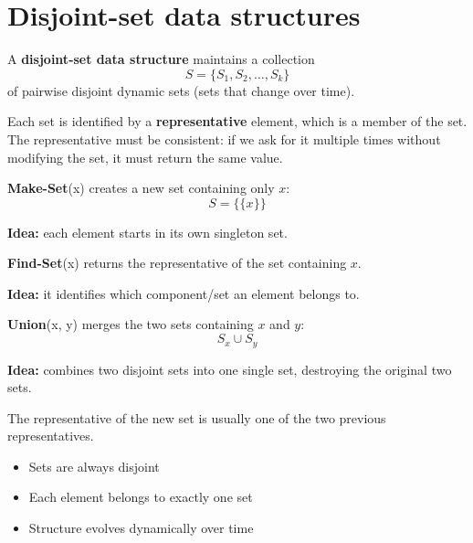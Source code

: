 \documentclass[11pt,a4paper,openany]{book}
\begin{document}
\vspace{2cm}





\chapter{Disjoint-set data structures}


\begin{defnbox}[title=Disjoint-Set Data Structure (Union-Find)]
A \textbf{disjoint-set data structure} maintains a collection
\[
S = \{S_1, S_2, \dots, S_k\}
\]
of pairwise disjoint dynamic sets (sets that change over time).

Each set is identified by a \textbf{representative} element, which is a member of the set.
The representative must be consistent: if we ask for it multiple times without modifying the set, it must return the same value.
\end{defnbox}

\begin{defnbox}[title=Make-Set]
\textbf{Make-Set}(x) creates a new set containing only $x$:
\[
S = \{\{x\}\}
\]

\textbf{Idea:} each element starts in its own singleton set.
\end{defnbox}

\begin{defnbox}[title=Find-Set]
\textbf{Find-Set}(x) returns the representative of the set containing $x$.

\textbf{Idea:} it identifies which component/set an element belongs to.
\end{defnbox}

\begin{defnbox}[title=Union]
\textbf{Union}(x, y) merges the two sets containing $x$ and $y$:
\[
S_x \cup S_y
\]

\textbf{Idea:} combines two disjoint sets into one single set, destroying the original two sets.

The representative of the new set is usually one of the two previous representatives.
\end{defnbox}

\begin{defnbox}[title=Key Properties]
\begin{itemize}
    \item Sets are always disjoint
    \item Each element belongs to exactly one set
    \item Structure evolves dynamically over time
\end{itemize}
\end{defnbox}
\end{document}
